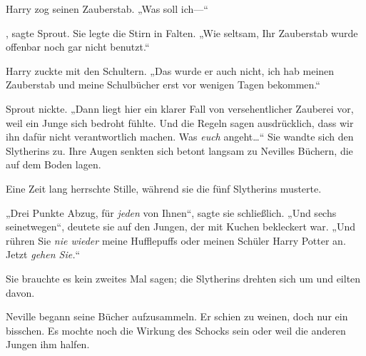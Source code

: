 Harry zog seinen Zauberstab. „Was soll ich—“

, sagte Sprout. Sie legte die Stirn in Falten. „Wie seltsam, Ihr Zauberstab wurde offenbar noch gar nicht benutzt.“

Harry zuckte mit den Schultern. „Das wurde er auch nicht, ich hab meinen Zauberstab und meine Schulbücher erst vor wenigen Tagen bekommen.“

Sprout nickte. „Dann liegt hier ein klarer Fall von versehentlicher Zauberei vor, weil ein Junge sich bedroht fühlte. Und die Regeln sagen ausdrücklich, dass wir ihn dafür nicht verantwortlich machen. Was \emph{euch} angeht…“ Sie wandte sich den Slytherins zu. Ihre Augen senkten sich betont langsam zu Nevilles Büchern, die auf dem Boden lagen.

Eine Zeit lang herrschte Stille, während sie die fünf Slytherins musterte.

„Drei Punkte Abzug, für \emph{jeden} von Ihnen“, sagte sie schließlich. „Und sechs seinetwegen“, deutete sie auf den Jungen, der mit Kuchen bekleckert war. „Und rühren Sie \emph{nie wieder} meine Hufflepuffs oder meinen Schüler Harry Potter an. Jetzt \emph{gehen Sie.}“

Sie brauchte es kein zweites Mal sagen; die Slytherins drehten sich um und eilten davon.

Neville begann seine Bücher aufzusammeln. Er schien zu weinen, doch nur ein bisschen. Es mochte noch die Wirkung des Schocks sein oder weil die anderen Jungen ihm halfen.

